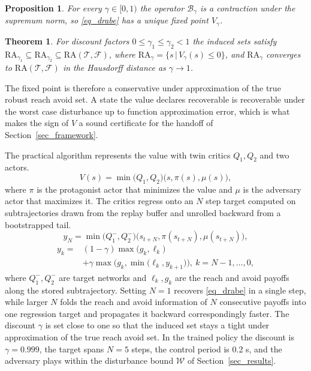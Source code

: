 \documentclass[5p,times,authoryear]{elsarticle}
\newtheorem{proposition}{Proposition}
\newtheorem{theorem}{Theorem}
\begin{document}
\begin{proposition}\label{prop_contraction}
For every $\gamma\in[0,1)$ the operator $\mathcal{B}_\gamma$ is a contraction under the supremum norm, so \eqref{eq_drabe} has a unique fixed point $V_\gamma$.
\end{proposition}
\begin{theorem}\label{thm_underapprox}
For discount factors $0\le\gamma_1\le\gamma_2<1$ the induced sets satisfy $\mathrm{RA}_{\gamma_1}\subseteq\mathrm{RA}_{\gamma_2}\subseteq\mathrm{RA}(\mathcal{T},\mathcal{F})$, where $\mathrm{RA}_{\gamma}=\{s\,|\,V_\gamma(s)\le 0\}$, and $\mathrm{RA}_{\gamma}$ converges to $\mathrm{RA}(\mathcal{T},\mathcal{F})$ in the Hausdorff distance as $\gamma\to 1$.
\end{theorem}
The fixed point is therefore a conservative under approximation of the true robust reach avoid set. A state the value declares recoverable is recoverable under the worst case disturbance up to function approximation error, which is what makes the sign of $V$ a sound certificate for the handoff of Section~\ref{sec_framework}.

The practical algorithm represents the value with twin critics $Q_1, Q_2$ and two actors.
\begin{equation}\label{eq_value}
V(s) = \min\big(Q_1, Q_2\big)\big(s, \pi(s), \mu(s)\big),
\end{equation}
where $\pi$ is the protagonist actor that minimizes the value and $\mu$ is the adversary actor that maximizes it. The critics regress onto an $N$ step target computed on subtrajectories drawn from the replay buffer and unrolled backward from a bootstrapped tail.
\begin{equation}
y_N = \min\big(Q_1^{-}, Q_2^{-}\big)\big(s_{t+N}, \pi(s_{t+N}), \mu(s_{t+N})\big),
\end{equation}
\begin{equation}
\begin{aligned}
y_k = {}& (1-\gamma)\max\big(g_k, \ell_k\big) \\
&+ \gamma\max\Big(g_k, \min\big(\ell_k, y_{k+1}\big)\Big),\ k = N-1, \dots, 0,
\end{aligned}
\end{equation}
where $Q_1^{-}, Q_2^{-}$ are target networks and $\ell_k, g_k$ are the reach and avoid payoffs along the stored subtrajectory. Setting $N=1$ recovers \eqref{eq_drabe} in a single step, while larger $N$ folds the reach and avoid information of $N$ consecutive payoffs into one regression target and propagates it backward correspondingly faster. The discount $\gamma$ is set close to one so that the induced set stays a tight under approximation of the true reach avoid set. In the trained policy the discount is $\gamma=0.999$, the target spans $N=5$ steps, the control period is 0.2 s, and the adversary plays within the disturbance bound $\mathcal{W}$ of Section~\ref{sec_results}.
\end{document}

